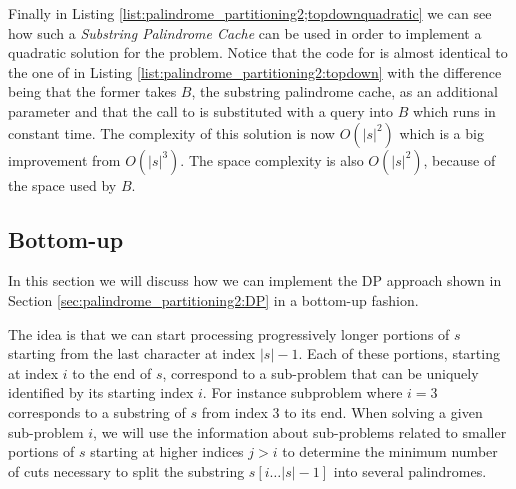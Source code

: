 Finally in Listing \ref{list:palindrome_partitioning2;topdownquadratic} we can see how such a
\textit{Substring Palindrome Cache} can be used in order to implement a quadratic solution for the
problem. Notice that the code for
 is almost identical to the one of
 in Listing
\ref{list:palindrome_partitioning2:topdown} with the difference being that the former takes $B$, the
substring palindrome cache, as an additional parameter and that the call to 
is substituted with a query into $B$ which runs in constant time. The complexity of this solution is
now $O(|s|^2)$ which is a big improvement from $O(|s|^3)$. The space complexity is also $O(|s|^2)$,
because of the space used by $B$.





\subsection{Bottom-up}
In this section we will discuss how we can implement the DP approach shown in Section
\ref{sec:palindrome_partitioning2:DP} in a bottom-up fashion.

The idea is that we can start processing progressively longer portions of $s$ starting from the last
character at index $|s|-1$. Each of these portions, starting at index $i$ to the end of $s$, 
correspond to a sub-problem that can be uniquely identified by its starting index $i$. For instance
subproblem where  $i=3$ corresponds to a substring of $s$ from index $3$ to its end. When solving a
given sub-problem $i$, we will use the information about sub-problems related to smaller portions of
$s$ starting at higher indices $j > i$  to determine the minimum number of cuts necessary to split
the substring $s[i \ldots |s|-1]$ into several palindromes.

